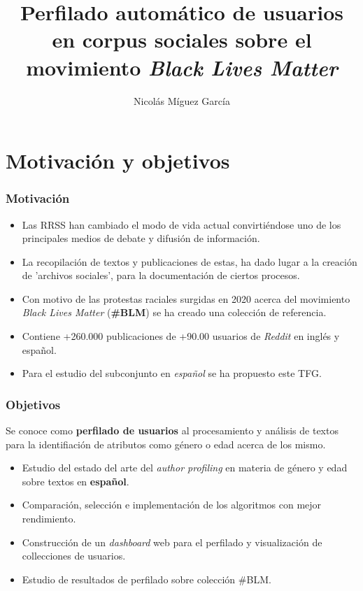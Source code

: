 \documentclass{beamer}
\title[Trabajo Fin de Grado]{Perfilado automático de usuarios en corpus sociales sobre el movimiento \textit{Black Lives Matter}}
\author{Nicolás Míguez García}
\institute[GEI]{Grado en Ingeniería Informática (Mención en Computación) \\
	\vspace{3mm}
	Patricia Martín Rodilla \\ 
	David Otero Freijeiro 
}
\date[\today]{}
\begin{document}
	
	\frame{\titlepage}
		
\section{Motivación y objetivos}
		\begin{frame}
			\frametitle{Motivación}
			\begin{itemize}
				\item Las RRSS han cambiado el modo de vida actual convirtiéndose uno de los principales medios de debate y difusión de información.
				\item La recopilación de textos y publicaciones de estas, ha dado lugar a la creación de 'archivos sociales', para la documentación de ciertos procesos.
				\item Con motivo de las protestas raciales surgidas en 2020 acerca del movimiento \textit{Black Lives Matter} (\textbf{\#BLM}) se ha creado una colección de referencia.
				\item Contiene +260.000 publicaciones de +90.00 usuarios de \emph{Reddit} en inglés y español.
				\item Para el estudio del subconjunto en \emph{español} se ha propuesto este TFG.
			\end{itemize}
		\end{frame}
		
		\begin{frame}
			\frametitle{Objetivos}
			\begin{definition}
				Se conoce como \textbf{perfilado de usuarios} al procesamiento y análisis de textos para la identifiación de atributos como género o edad acerca de los mismo.
			\end{definition}
			\begin{itemize}
				\item Estudio del estado del arte del \textit{author profiling} en materia de género y edad sobre textos en \textbf{español}.
				\item Comparación, selección e implementación de los algoritmos con mejor rendimiento.
				\item Construcción de un \textit{dashboard} web para el perfilado y visualización de collecciones de usuarios.
				\item Estudio de resultados de perfilado sobre colección \#BLM.
			\end{itemize}
		\end{frame}
		
\end{document}
